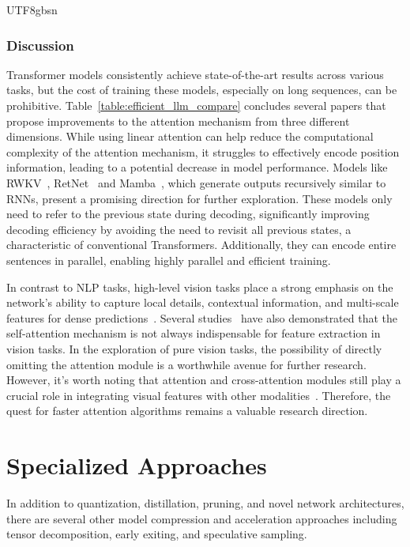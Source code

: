 \documentclass[10pt,journal,compsoc]{IEEEtran}
\newcommand{\<}{\left\langle}
\renewcommand{\>}{\right\rangle}
\newcommand{\1}{\mathbbm{1}}
\begin{document}
\begin{CJK}{UTF8}{gbsn}
\subsubsection{Discussion}

Transformer models consistently achieve state-of-the-art results across various tasks, but the cost of training these models, especially on long sequences, can be prohibitive. Table~\ref{table:efficient_llm_compare} concludes several papers that propose improvements to the attention mechanism from three different dimensions. While using linear attention can help reduce the computational complexity of the attention mechanism, it struggles to effectively encode position information, leading to a potential decrease in model performance.
Models like RWKV~\cite{peng2023rwkv}, RetNet~\cite{sun2023retentive} and Mamba~\cite{gu2023mamba}, which generate outputs recursively similar to RNNs, present a promising direction for further exploration. These models only need to refer to the previous state during decoding, significantly improving decoding efficiency by avoiding the need to revisit all previous states, a characteristic of conventional Transformers. Additionally, they can encode entire sentences in parallel, enabling highly parallel and efficient training.


In contrast to NLP tasks, high-level vision tasks place a strong emphasis on the network's ability to capture local details, contextual information, and multi-scale features for dense predictions~\cite{wang2021pyramid}. Several studies~\cite{chen2023vanillanet,yu2022metaformer} have also demonstrated that the self-attention mechanism is not always indispensable for feature extraction in vision tasks. In the exploration of pure vision tasks, the possibility of directly omitting the attention module is a worthwhile avenue for further research. However, it's worth noting that attention and cross-attention modules still play a crucial role in integrating visual features with other modalities~\cite{radford2021learning}. Therefore, the quest for faster attention algorithms remains a valuable research direction.

\section{Specialized Approaches}
\label{sec:other}
In addition to quantization, distillation, pruning, and novel network architectures, there are several other model compression and acceleration approaches including tensor decomposition, early exiting, and speculative sampling.


\end{CJK}
\end{document}
